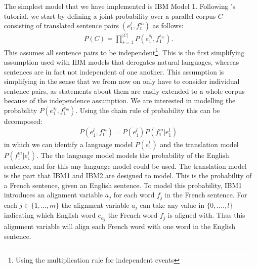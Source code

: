 \documentclass[11pt,a4paper]{article}
\begin{document}
The simplest model that we have implemented is IBM Model 1. Following \citet{schulz}'s tutorial, we start by defining a joint probability over a parallel corpus $C$ consisting of translated sentence pairs $(e_1^{l}, f_1^{m})$ as follows:
\begin{align*}
    P(C)=\prod^{|C|}_{s=1}P(e_1^{s_l}, f_1^{s_m}).
\end{align*}
This assumes all sentence pairs to be independent\footnote{Using the multiplication rule for independent events}. This is the first simplifying assumption used with IBM models that derogates natural languages, whereas sentences are in fact not independent of one another.
This assumption is simplifying in the sense that we from now on only have to consider individual sentence pairs, as statements about them are easily extended to a whole corpus because of the independence assumption. 
We are interested in modelling the probability $P(e_1^{s_l}, f_1^{s_m})$. Using the chain rule of probability this can be decomposed:
\begin{align*}
    P(e_1^{l}, f_1^{m})=P(e_1^l) P(f_1^m|e_1^l)
\end{align*}
in which we can identify a language model $P(e_1^l)$ and the translation model $P(f_1^m|e_1^l)$. The the language model models the probability of the English sentence, and for this any language model could be used. The translation model is the part that IBM1 and IBM2 are designed to model. This is the probability of a French sentence, given an English sentence. To model this probability, IBM1 introduces an alignment variable $a_j$ for each word $f_j$ in the French sentence. For each $j\in \{1,\dots,m\}$ the alignment variable $a_j$ can take any value in $\{0,....,l\}$ indicating which English word $e_{a_j}$ the French word $f_j$ is aligned with. Thus this alignment variable will align each French word with one word in the English sentence.
\end{document}
